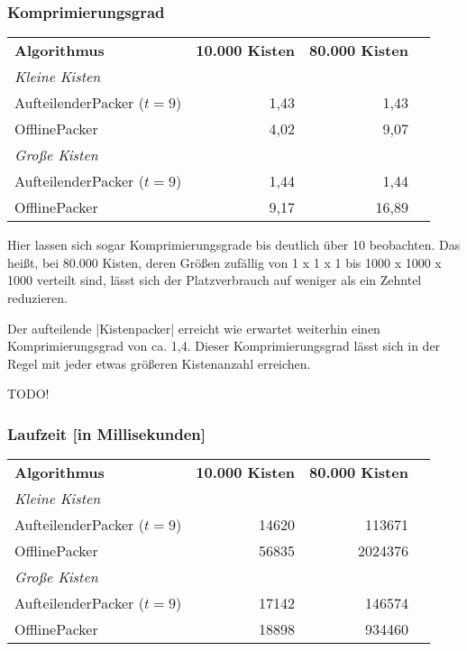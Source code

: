 \subsubsection*{Komprimierungsgrad}
\begin{center}
\begin{tabular}{lrrr}
\vspace*{.42em}
\textbf{Algorithmus}   & \textbf{10.000 Kisten} & \textbf{80.000 Kisten}\\
\textit{Kleine Kisten} & & \\
 AufteilenderPacker ($t=9$)  	& 1,43		& 1,43			\\
 OfflinePacker			& 4,02		& 9,07			\\
\vspace*{.42em}
\textit{Große Kisten} & & \\
 AufteilenderPacker ($t=9$)  	& 1,44		& 1,44			\\
 OfflinePacker			& 9,17		& 16,89			\\
\end{tabular}
\end{center}
 Hier lassen sich sogar Komprimierungsgrade bis deutlich über 10 beobachten.
 Das heißt, bei 80.000 Kisten, deren Größen zufällig von 1 x 1 x 1 bis 1000 x 1000 x 1000 verteilt sind,
  lässt sich der Platzverbrauch auf weniger als ein Zehntel reduzieren.

 Der aufteilende |Kistenpacker| erreicht wie erwartet weiterhin einen Komprimierungsgrad von ca. 1,4.
 Dieser Komprimierungsgrad lässt sich in der Regel mit jeder etwas größeren Kistenanzahl erreichen.

 TODO!
 
\subsubsection*{Laufzeit [in Millisekunden]}
\begin{center}
\begin{tabular}{lrrr}
\vspace*{.42em}
\textbf{Algorithmus} 	& \textbf{10.000 Kisten} & \textbf{80.000 Kisten} \\
\textit{Kleine Kisten} & & \\
 AufteilenderPacker ($t=9$)  	& 14620		& 113671		\\
 OfflinePacker			& 56835		& 2024376		\\
\vspace*{.42em}
\textit{Große Kisten} & & \\
 AufteilenderPacker ($t=9$)  	& 17142		& 146574		\\
 OfflinePacker			& 18898		& 934460		\\
\end{tabular}
\end{center}

